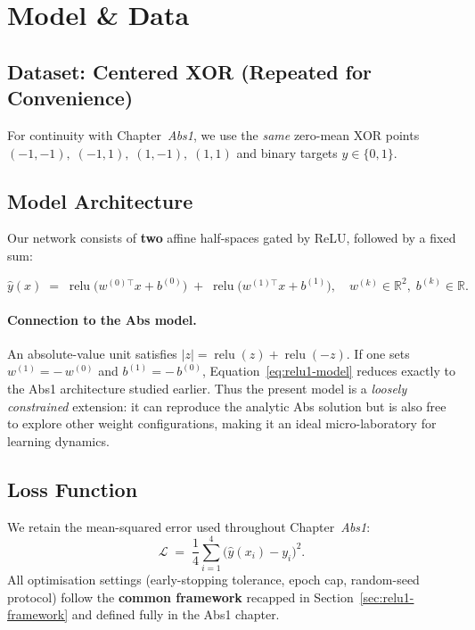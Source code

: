 \section{Model \& Data}
\label{sec:relu1-model-data}

\subsection*{Dataset: Centered XOR (Repeated for Convenience)}
For continuity with Chapter~\textit{Abs1}, we use the \emph{same} zero-mean XOR points \(({-}1,{-}1),\;({-}1,1),\;(1,{-}1),\;(1,1)\) and binary targets \(y\in\{0,1\}\).

\subsection*{Model Architecture}
Our network consists of \textbf{two} affine half-spaces gated by ReLU, followed by a fixed sum:

\begin{equation}
    \hat y(x)
    \;=\;
    \operatorname{relu}\!\bigl(w^{(0)\!\top}x + b^{(0)}\bigr)
    \;+\;
    \operatorname{relu}\!\bigl(w^{(1)\!\top}x + b^{(1)}\bigr),
    \quad
    w^{(k)}\!\in\mathbb{R}^{2},\;
    b^{(k)}\!\in\mathbb{R}.
    \label{eq:relu1-model}
\end{equation}

\paragraph{Connection to the Abs model.}
An absolute-value unit satisfies \(|z|=\operatorname{relu}(z)+\operatorname{relu}(-z).\) If one sets \(w^{(1)}=-\,w^{(0)}\) and \(b^{(1)}=-\,b^{(0)}\), Equation~\eqref{eq:relu1-model} reduces exactly to the Abs1 architecture studied earlier. Thus the present model is a \emph{loosely constrained} extension: it can reproduce the analytic Abs solution but is also free to explore other weight configurations, making it an ideal micro-laboratory for learning dynamics.

\subsection*{Loss Function}
We retain the mean-squared error used throughout Chapter~\textit{Abs1}:
\begin{equation}
    \mathcal{L}
    \;=\;
    \frac14
    \sum_{i=1}^{4}
    \bigl(\hat y(x_i) - y_i\bigr)^2.
    \label{eq:relu1-loss}
\end{equation}
All optimisation settings (early-stopping tolerance, epoch cap, random-seed protocol) follow the \textbf{common framework} recapped in Section~\ref{sec:relu1-framework} and defined fully in the Abs1 chapter.

